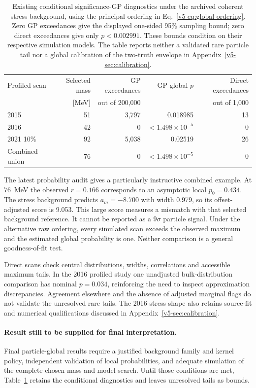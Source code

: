 \begin{table}[htbp]\centering\small
\begin{tabular}{lrrrr}\toprule
Profiled scan & Selected mass & GP exceedances & GP global $p$ & Direct exceedances\\
 & [MeV] & out of 200,000 & & out of 1,000\\\midrule
2015 & 51 & 3,797 & 0.018985 & 13\\
2016 & 42 & 0 & $<1.498\times10^{-5}$ & 0\\
2021 10\% & 92 & 5,038 & 0.02519 & 26\\
Combined union & 76 & 0 & $<1.498\times10^{-5}$ & 0\\\bottomrule
\end{tabular}
\caption{Existing conditional significance-GP diagnostics under the
archived coherent stress background, using the principal ordering in
Eq.~\ref{v5-eq:global-ordering}. Zero GP exceedances give the displayed
one-sided 95\% sampling bound; zero direct exceedances give only
$p<0.002991$. These bounds condition on their respective simulation models.
The table reports neither a validated rare particle tail nor a global
calibration of the two-truth envelope in Appendix~\ref{v5-sec:calibration}.}
\label{v5-tab:global-diagnostics}
\end{table}

The latest probability audit gives a particularly instructive combined
example. At 76~MeV the observed $r=0.166$ corresponds to an asymptotic local
$p_0=0.434$. The stress background predicts $a_m=-8.700$ with width 0.979,
so its offset-adjusted score is 9.053. This large score measures a
mismatch with that selected background reference. It cannot be reported
as a $9\sigma$ particle signal. Under the alternative raw ordering, every
simulated scan exceeds the observed maximum and the estimated global
probability is one. Neither comparison is a general goodness-of-fit test.

Direct scans check central distributions, widths, correlations and
accessible maximum tails. In the 2016 profiled study one unadjusted
bulk-distribution comparison has nominal $p=0.034$, reinforcing the need
to inspect approximation discrepancies. Agreement elsewhere and the
absence of adjusted marginal flags do not validate the unresolved rare
tails. The 2016 stress shape also retains source-fit and numerical
qualifications discussed in Appendix~\ref{v5-sec:calibration}.

\paragraph{Result still to be supplied for final interpretation.}
Final particle-global results require a justified background family and
kernel policy, independent validation of local probabilities, and adequate
simulation of the complete chosen mass and model search. Until those
conditions are met, Table~\ref{v5-tab:global-diagnostics} retains the
conditional diagnostics and leaves unresolved tails as bounds.
